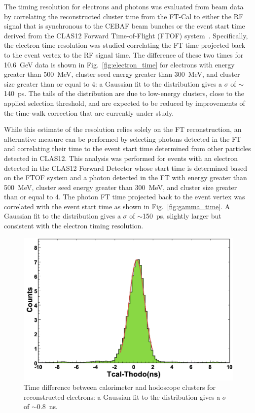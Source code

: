 The timing resolution for electrons and photons was evaluated from beam data by correlating the reconstructed
cluster time from the FT-Cal to either the RF signal that is synchronous to the CEBAF beam bunches or the event start time derived from the CLAS12 Forward Time-of-Flight (FTOF) system~\cite{ftof}.
Specifically, the electron time resolution was studied correlating the FT time projected back to the event vertex
to the RF signal time. The difference of these two times for 10.6~GeV data is shown in Fig.~\ref{fig:electron_time}
for electrons with energy greater than 500~MeV, cluster seed energy greater than 300~MeV, and cluster size
greater than or equal to 4: a Gaussian fit to the distribution gives a $\sigma$ of $\sim$140~ps. The tails of the
distribution are due to low-energy clusters, close to the applied selection threshold, and are expected to be reduced
by improvements of the time-walk correction that are currently under study.

While this estimate of the resolution relies solely on the FT reconstruction, an alternative measure can be
performed by selecting photons detected in the FT and correlating their time to the event start time determined
from other particles detected in CLAS12. This analysis was performed for events with an electron detected in
the CLAS12 Forward Detector whose start time is determined based on the FTOF system and a photon detected in
the FT with energy greater than 500~MeV, cluster seed energy greater than 300~MeV, and cluster size greater than
or equal to 4. The photon FT time projected back to the event vertex was correlated with the event start time as
shown in Fig.~\ref{fig:gamma_time}. A Gaussian fit to the distribution gives a $\sigma$ of $\sim$150~ps, slightly
larger but consistent with the electron timing resolution.

\begin{figure}[h]
\includegraphics[height=0.6\columnwidth]{fig/ftcalhodo_time.png}
\caption{Time difference between calorimeter and hodoscope clusters for reconstructed electrons: a Gaussian fit
  to the distribution gives a $\sigma$ of $\sim$0.8~ns.}
\label{fig:ftcalhodo_time}
\end{figure}

